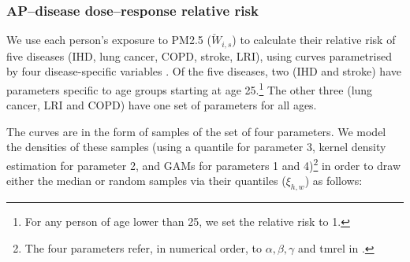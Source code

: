 \documentclass{article}
\begin{document}





\subsubsection{AP--disease dose--response relative risk}
We use each person's exposure to PM2.5 ($\check{W}_{i,s}$) to calculate their relative risk of five diseases (IHD, lung cancer, COPD, stroke, LRI), using curves parametrised by four disease-specific variables \citep{Burnett2014}. Of the five diseases, two (IHD and stroke) have parameters specific to age groups starting at age 25.\footnote{For any person of age lower than 25, we set the relative risk to 1.} The other three (lung cancer, LRI and COPD) have one set of parameters for all ages.

The curves are in the form of samples of the set of four parameters. We model the densities of these samples (using a quantile for parameter 3, kernel density estimation for parameter 2, and GAMs for parameters 1 and 4)\footnote{The four parameters refer, in numerical order, to $\alpha, \beta, \gamma$ and tmrel in \citet{Burnett2014}.} in order to draw either the median or random samples via their quantiles ($\xi_{h,w}$) as follows:
\end{document}

